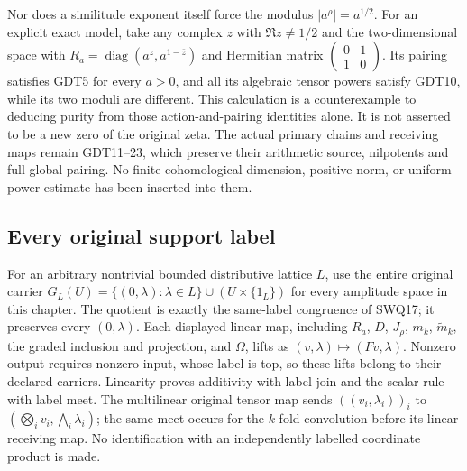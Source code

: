 Nor does a similitude exponent itself force
the modulus $|a^\rho|=a^{1/2}$.
For an explicit exact model, take any complex
$z$ with $\Re z\ne1/2$ and the two-dimensional
space with
$R_a=\operatorname{diag}(a^z,a^{1-\bar z})$
and Hermitian matrix
$\left(\begin{smallmatrix}0&1\\1&0\end{smallmatrix}\right)$.
Its pairing satisfies GDT5 for every $a>0$,
and all its algebraic tensor powers satisfy
GDT10, while its two moduli are different.
This calculation is a counterexample to
deducing purity from those action-and-pairing
identities alone. It is not asserted to be
a new zero of the original zeta.
The actual primary chains and receiving maps
remain GDT11--23, which preserve their
arithmetic source, nilpotents and full global
pairing. No finite cohomological dimension,
positive norm, or uniform power estimate has
been inserted into them.

\subsection{Every original support label}

For an arbitrary nontrivial bounded distributive
lattice $L$, use the entire original carrier
$G_L(U)=\{(0,\lambda):\lambda\in L\}
\cup(U\times\{1_L\})$ for every amplitude
space in this chapter.
The quotient is exactly the same-label
congruence of SWQ17; it preserves every
$(0,\lambda)$.
Each displayed linear map, including $R_a$,
$D$, $J_\rho$, $m_k$, $\widetilde m_k$,
the graded inclusion and projection, and
$\Omega$, lifts as $(v,\lambda)\mapsto(Fv,\lambda)$.
Nonzero output requires nonzero input,
whose label is top, so these lifts belong
to their declared carriers.
Linearity proves additivity with label join
and the scalar rule with label meet.
The multilinear original tensor map sends
$((v_i,\lambda_i))_i$ to
$(\bigotimes_i v_i,\bigwedge_i\lambda_i)$;
the same meet occurs for the $k$-fold
convolution before its linear receiving map.
No identification with an independently
labelled coordinate product is made.

